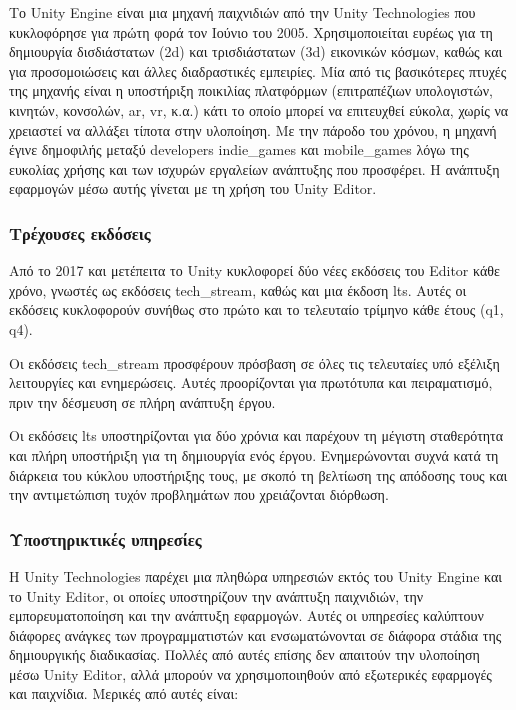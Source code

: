 Το Unity Engine\cite{noauthor_real-time_nodate} είναι μια μηχανή παιχνιδιών από την Unity Technologies που κυκλοφόρησε για πρώτη φορά τον Ιούνιο του 2005. Χρησιμοποιείται ευρέως για τη δημιουργία δισδιάστατων (\acrshort{2d}) και τρισδιάστατων (\acrshort{3d}) εικονικών κόσμων, καθώς και για προσομοιώσεις και άλλες διαδραστικές εμπειρίες. Μία από τις βασικότερες πτυχές της μηχανής είναι η υποστήριξη ποικιλίας πλατφόρμων (επιτραπέζιων υπολογιστών, κινητών, κονσολών, \acrshort{ar}, \acrshort{vr}, κ.α.) κάτι το οποίο μπορεί να επιτευχθεί εύκολα, χωρίς να χρειαστεί να αλλάξει τίποτα στην υλοποίηση. Με την πάροδο του χρόνου, η μηχανή έγινε δημοφιλής μεταξύ \glspl{developer} \glspl{indie_game} και \glspl{mobile_game} λόγω της ευκολίας χρήσης και των ισχυρών εργαλείων ανάπτυξης που προσφέρει. Η ανάπτυξη εφαρμογών μέσω αυτής γίνεται με τη χρήση του Unity Editor\cite{noauthor_unity_2024,haas_history_2014}.

\subsubsection{Τρέχουσες εκδόσεις}

Από το 2017 και μετέπειτα\cite{noauthor_unity_nodate} το Unity κυκλοφορεί δύο νέες εκδόσεις του Editor κάθε χρόνο, γνωστές ως εκδόσεις \gls{tech_stream}, καθώς και μια έκδοση \acrshort{lts}. Αυτές οι εκδόσεις κυκλοφορούν συνήθως στο πρώτο και το τελευταίο τρίμηνο κάθε έτους (\gls{q1}, \gls{q4}).

Οι εκδόσεις \gls{tech_stream} προσφέρουν πρόσβαση σε όλες τις τελευταίες υπό εξέλιξη λειτουργίες και ενημερώσεις. Αυτές προορίζονται για πρωτότυπα και πειραματισμό, πριν την δέσμευση σε πλήρη ανάπτυξη έργου.

Οι εκδόσεις \acrshort{lts} υποστηρίζονται για δύο χρόνια και παρέχουν τη μέγιστη σταθερότητα και πλήρη υποστήριξη για τη δημιουργία ενός έργου. Ενημερώνονται συχνά κατά τη διάρκεια του κύκλου υποστήριξης τους, με σκοπό τη βελτίωση της απόδοσης τους και την αντιμετώπιση τυχόν προβλημάτων που χρειάζονται διόρθωση\cite{technologies_lts_nodate}.

\subsubsection{Υποστηρικτικές υπηρεσίες}

Η Unity Technologies παρέχει μια πληθώρα υπηρεσιών εκτός του Unity Engine και το Unity Editor, οι οποίες υποστηρίζουν την ανάπτυξη παιχνιδιών, την εμπορευματοποίηση και την ανάπτυξη εφαρμογών. Αυτές οι υπηρεσίες καλύπτουν διάφορες ανάγκες των προγραμματιστών και ενσωματώνονται σε διάφορα στάδια της δημιουργικής διαδικασίας. Πολλές από αυτές επίσης δεν απαιτούν την υλοποίηση μέσω Unity Editor, αλλά μπορούν να χρησιμοποιηθούν από εξωτερικές εφαρμογές και παιχνίδια. Μερικές από αυτές είναι:

